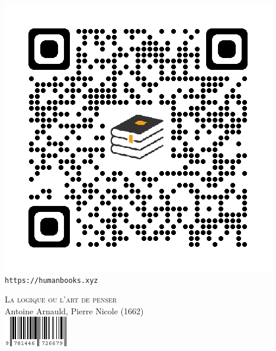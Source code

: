 \thispagestyle{empty}
\begin{center}
	\includegraphics[scale=0.25]{images/_QR_code-HumanBooks_index.png}
	\\\texttt{https://humanbooks.xyz}
\end{center}
\vfill
\begin{center}
	{\scshape \large La logique ou l'art de penser}\\Antoine Arnauld, Pierre Nicole (1662)\\
	\bigbreak
	\includegraphics[scale=0.66]{images/_ISBN_poche.png}
\end{center}
